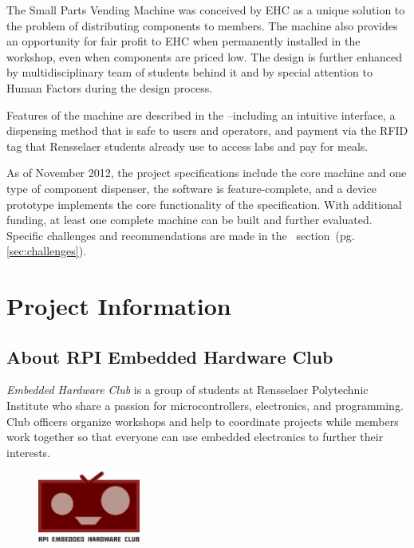 \documentclass[12pt,oneside,final]{article}
\begin{document}
The Small Parts Vending Machine was conceived by EHC as a unique solution to the problem of distributing components to members. The machine also provides an opportunity for fair profit to EHC when permanently installed in the workshop, even when components are priced low. The design is further enhanced by multidisciplinary team of students behind it and by special attention to Human Factors during the design process.

Features of the machine are described in the \emph{}--including an intuitive interface, a dispensing method that is safe to users and operators, and payment via the RFID tag that Rensselaer students already use to access labs and pay for meals.

As of November 2012, the project specifications include the core machine and one type of component dispenser, the software is feature-complete, and a device prototype implements the core functionality of the specification. With additional funding, at least one complete machine can be built and further evaluated. Specific challenges and recommendations are made in the \emph{}~section~(pg.\ref{sec:challenges}).


\pagebreak
\section{Project Information}
\label{sec:info}

\subsection{About RPI Embedded Hardware Club}
\emph{Embedded Hardware Club} is a group of students at Rensselaer Polytechnic Institute who share a passion for microcontrollers, electronics, and programming. Club officers organize workshops and help to coordinate projects while members work together so that everyone can use embedded electronics to further their interests.

\begin{figure}%
  \centering%
  \includegraphics[width=0.30\textwidth]{2012-08-30_ehc.png}%
\end{figure}
\end{document}
